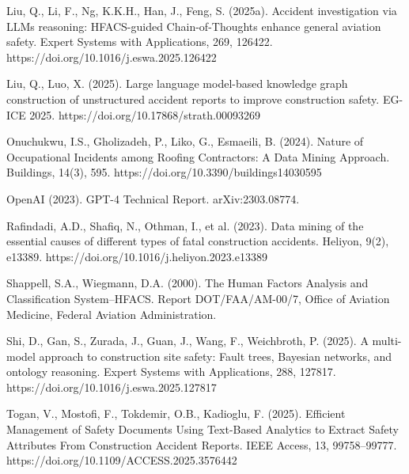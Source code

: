 \documentclass[11pt]{article}
\begin{document}
Liu, Q., Li, F., Ng, K.K.H., Han, J., Feng, S. (2025a). Accident investigation via LLMs reasoning: HFACS-guided Chain-of-Thoughts enhance general aviation safety. Expert Systems with Applications, 269, 126422. https:/\allowbreak{}/\allowbreak{}doi.\allowbreak{}org/\allowbreak{}10.\allowbreak{}1016/\allowbreak{}j.\allowbreak{}eswa.\allowbreak{}2025.\allowbreak{}126422

Liu, Q., Luo, X. (2025). Large language model-based knowledge graph construction of unstructured accident reports to improve construction safety. EG-ICE 2025. https:/\allowbreak{}/\allowbreak{}doi.\allowbreak{}org/\allowbreak{}10.\allowbreak{}17868/\allowbreak{}strath.\allowbreak{}00093269

Onuchukwu, I.S., Gholizadeh, P., Liko, G., Esmaeili, B. (2024). Nature of Occupational Incidents among Roofing Contractors: A Data Mining Approach. Buildings, 14(3), 595. https:/\allowbreak{}/\allowbreak{}doi.\allowbreak{}org/\allowbreak{}10.\allowbreak{}3390/\allowbreak{}buildings14030595

OpenAI (2023). GPT-4 Technical Report. arXiv:2303.08774.

Rafindadi, A.D., Shafiq, N., Othman, I., et al. (2023). Data mining of the essential causes of different types of fatal construction accidents. Heliyon, 9(2), e13389. https:/\allowbreak{}/\allowbreak{}doi.\allowbreak{}org/\allowbreak{}10.\allowbreak{}1016/\allowbreak{}j.\allowbreak{}heliyon.\allowbreak{}2023.\allowbreak{}e13389

Shappell, S.A., Wiegmann, D.A. (2000). The Human Factors Analysis and Classification System--HFACS. Report DOT/FAA/AM-00/7, Office of Aviation Medicine, Federal Aviation Administration.

Shi, D., Gan, S., Zurada, J., Guan, J., Wang, F., Weichbroth, P. (2025). A multi-model approach to construction site safety: Fault trees, Bayesian networks, and ontology reasoning. Expert Systems with Applications, 288, 127817. https:/\allowbreak{}/\allowbreak{}doi.\allowbreak{}org/\allowbreak{}10.\allowbreak{}1016/\allowbreak{}j.\allowbreak{}eswa.\allowbreak{}2025.\allowbreak{}127817

Togan, V., Mostofi, F., Tokdemir, O.B., Kadioglu, F. (2025). Efficient Management of Safety Documents Using Text-Based Analytics to Extract Safety Attributes From Construction Accident Reports. IEEE Access, 13, 99758--99777. https:/\allowbreak{}/\allowbreak{}doi.\allowbreak{}org/\allowbreak{}10.\allowbreak{}1109/\allowbreak{}ACCESS.\allowbreak{}2025.\allowbreak{}3576442
\end{document}

